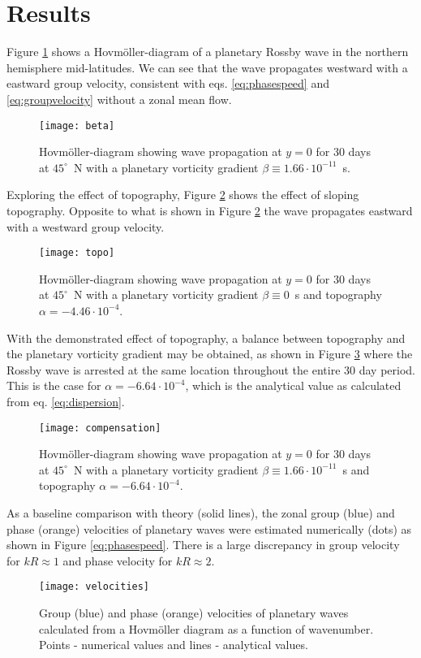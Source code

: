 \section{Results}
\label{sec:results}

Figure \ref{fig:beta} shows a Hovmöller-diagram of a planetary Rossby wave in the northern hemisphere mid-latitudes. We can see that the wave propagates westward with a eastward group velocity, consistent with eqs. \eqref{eq:phasespeed} and \eqref{eq:groupvelocity} without a zonal mean flow.
	\begin{figure}[htbp]
		\centering
		\texttt{[image: beta]}
		\caption{Hovmöller-diagram showing wave propagation at $y=0$ for 30 days at $45^\circ \,$ N with a planetary vorticity gradient $\beta \equiv 1.66 \cdot 10^{-11} \,$ s.}
		\label{fig:beta}
	\end{figure}

Exploring the effect of topography, Figure \ref{fig:topo} shows the effect of sloping topography. Opposite to what is shown in Figure \ref{fig:topo} the wave propagates eastward with a westward group velocity.
	\begin{figure}[htbp]
		\centering
		\texttt{[image: topo]}
		\caption{Hovmöller-diagram showing wave propagation at $y=0$ for 30 days at $45^\circ \,$ N with a planetary vorticity gradient $\beta \equiv 0 \,$ s and topography $\alpha = - 4.46 \cdot 10^{-4}$.}
		\label{fig:topo}
	\end{figure}

With the demonstrated effect of topography, a balance between topography and the planetary vorticity gradient may be obtained, as shown in Figure \ref{fig:compensation} where the Rossby wave is arrested at the same location throughout the entire 30 day period. This is the case for $\alpha = -6.64 \cdot 10^{-4}$, which is the analytical value as calculated from eq. \eqref{eq:dispersion}.
	\begin{figure}[htbp]
		\centering
		\texttt{[image: compensation]}
		\caption{Hovmöller-diagram showing wave propagation at $y=0$ for 30 days at $45^\circ \,$ N with a planetary vorticity gradient $\beta \equiv 1.66 \cdot 10^{-11} \,$ s and topography $\alpha = -6.64 \cdot 10^{-4}$.}
		\label{fig:compensation}
	\end{figure}

As a baseline comparison with theory (solid lines), the zonal group (blue) and phase (orange) velocities of planetary waves were estimated numerically (dots) as shown in Figure \ref{eq:phasespeed}. There is a large discrepancy in group velocity for $kR \approx 1$ and phase velocity for $kR \approx 2$.
	\begin{figure}[htbp]
		\centering
		\texttt{[image: velocities]}
		\caption{Group (blue) and phase (orange) velocities of planetary waves calculated from a Hovmöller diagram as a function of wavenumber. Points - numerical values and lines - analytical values.}
		\label{fig:velocities}
	\end{figure}

